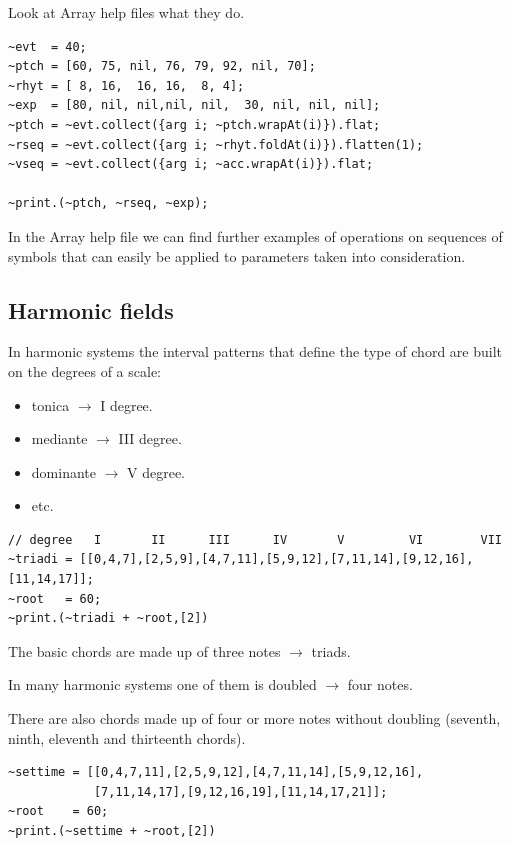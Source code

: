 \begin{itemize}
    Look at Array help files what they do.

\begin{lstlisting}[frame=single] 
~evt  = 40;
~ptch = [60, 75, nil, 76, 79, 92, nil, 70];
~rhyt = [ 8, 16,  16, 16,  8, 4];
~exp  = [80, nil, nil,nil, nil,  30, nil, nil, nil];
~ptch = ~evt.collect({arg i; ~ptch.wrapAt(i)}).flat;
~rseq = ~evt.collect({arg i; ~rhyt.foldAt(i)}).flatten(1);
~vseq = ~evt.collect({arg i; ~acc.wrapAt(i)}).flat;

~print.(~ptch, ~rseq, ~exp);
\end{lstlisting}
\end{itemize} 

In the Array help file we can find further examples of operations on sequences of symbols that can easily be applied to parameters taken into consideration.

\subsection{Harmonic fields}\label{harmonic-fields}

In harmonic systems the interval patterns that define the type of chord are built on the degrees of a scale:

\begin{itemize}
\tightlist
\item tonica \(\rightarrow\) I degree. 
\item mediante \(\rightarrow\) III degree.
\item dominante \(\rightarrow\) V degree.
\item etc.
\end{itemize}

\begin{lstlisting}[frame=single] 
// degree   I       II      III      IV       V         VI        VII
~triadi = [[0,4,7],[2,5,9],[4,7,11],[5,9,12],[7,11,14],[9,12,16],[11,14,17]];
~root   = 60;
~print.(~triadi + ~root,[2])
\end{lstlisting}

The basic chords are made up of three notes \(\rightarrow\) triads. 

In many harmonic systems one of them is doubled \(\rightarrow\) four notes.

There are also chords made up of four or more notes without doubling (seventh, ninth, eleventh and thirteenth chords).

\begin{lstlisting}[frame=single] 
~settime = [[0,4,7,11],[2,5,9,12],[4,7,11,14],[5,9,12,16],
            [7,11,14,17],[9,12,16,19],[11,14,17,21]];
~root    = 60;
~print.(~settime + ~root,[2])
\end{lstlisting}

